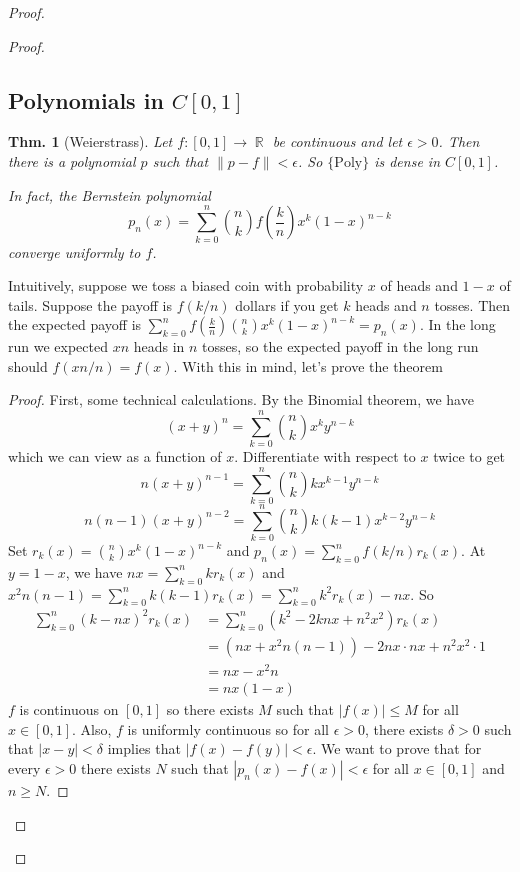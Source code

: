 \documentclass[12pt, a4paper]{book}
\DeclareMathOperator{\R}{\mathbb{R}}
\newcommand{\norm}[1]{\left\lVert#1\right\rVert} %
\newtheorem{theorem}{Thm.}[section]
\theoremstyle{nonumberplain}
\newtheorem{proof}{Proof}
\begin{document}
\begin{proof}
\begin{proof}
\subsection{Polynomials in $C[0,1]$}
\begin{theorem}[Weierstrass]
    Let $f:[0,1]\to\R$ be continuous and let $\epsilon>0$.
    Then there is a polynomial $p$ such that $\norm{p-f}<\epsilon$. So $\{\text{Poly}\}$ is dense in $C[0,1]$.

    In fact, the Bernstein polynomial
    \[p_n(x)=\sum\limits_{k=0}^n\binom{n}{k}f\left(\frac{k}{n}\right)x^k(1-x)^{n-k}\]
    converge uniformly to $f$.
\end{theorem}
Intuitively, suppose we toss a biased coin with probability $x$ of heads and $1-x$ of tails.
Suppose the payoff is $f(k/n)$ dollars if you get $k$ heads and $n$ tosses.
Then the expected payoff is $\sum\limits_{k=0}^nf\left(\frac{k}{n}\right)\binom{n}{k}x^k(1-x)^{n-k}=p_n(x)$.
In the long run we expected $xn$ heads in $n$ tosses, so the expected payoff in the long run should $f(xn/n)=f(x)$.
With this in mind, let's prove the theorem
\begin{proof}
    First, some technical calculations.
    By the Binomial theorem, we have
    \[(x+y)^n=\sum\limits_{k=0}^n\binom{n}{k}x^ky^{n-k}\]
    which we can view as a function of $x$.
    Differentiate with respect to $x$ twice to get
    \[n(x+y)^{n-1}=\sum\limits_{k=0}^n\binom{n}{k}kx^{k-1}y^{n-k}\]
    \[n(n-1)(x+y)^{n-2}=\sum\limits_{k=0}^n\binom{n}{k}k(k-1)x^{k-2}y^{n-k}\]
    Set $r_k(x)=\binom{n}{k}x^k(1-x)^{n-k}$ and $p_n(x)=\sum\limits_{k=0}^nf(k/n)r_k(x)$.
    At $y=1-x$, we have $nx=\sum\limits_{k=0}^nkr_k(x)$ and $x^2n(n-1)=\sum\limits_{k=0}^nk(k-1)r_k(x)=\sum\limits_{k=0}^nk^2r_k(x)-nx$.
    So
    \begin{align*}
        \sum\limits_{k=0}^n (k-nx)^2r_k(x) &= \sum\limits_{k=0}^n (k^2-2knx+n^2x^2)r_k(x)\\
                                           &= (nx+x^2n(n-1))-2nx\cdot nx+n^2x^2\cdot 1\\
                                           &= nx-x^2n\\
                                           &= nx(1-x)
    \end{align*}
    $f$ is continuous on $[0,1]$ so there exists $M$ such that $|f(x)|\leq M$ for all $x\in[0,1]$.
    Also, $f$ is uniformly continuous so for all $\epsilon>0$, there exists $\delta>0$ such that $|x-y|<\delta$ implies that $|f(x)-f(y)|<\epsilon$.
    We want to prove that for every $\epsilon>0$ there exists $N$ such that $|p_n(x)-f(x)|<\epsilon$ for all $x\in[0,1]$ and $n\geq N$.

\end{proof}
\end{proof}
\end{proof}
\end{document}
